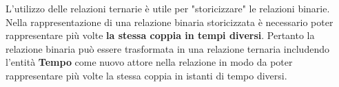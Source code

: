 \documentclass[a4paper]{article}
\begin{document}
\vspace{1em}
\noindent
L'utilizzo delle relazioni ternarie è utile per "storicizzare" le relazioni binarie.
Nella rappresentazione di una relazione binaria storicizzata è necessario poter rappresentare
più volte \textbf{la stessa coppia in tempi diversi}. Pertanto la relazione binaria può
essere trasformata in una relazione ternaria includendo l'entità \textbf{Tempo} come
nuovo attore nella relazione in modo da poter rappresentare più volte la stessa coppia
in istanti di tempo diversi.
\end{document}

